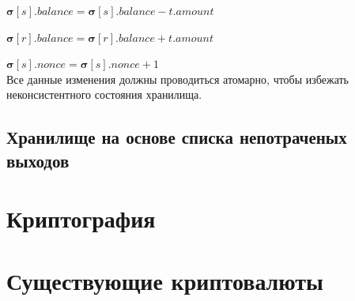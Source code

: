 $\boldsymbol{\sigma}[s].balance = \boldsymbol{\sigma}[s].balance - t.amount$

$\boldsymbol{\sigma}[r].balance = \boldsymbol{\sigma}[r].balance + t.amount$

$\boldsymbol{\sigma}[s].nonce = \boldsymbol{\sigma}[s].nonce + 1$\\
Все данные изменения должны проводиться атомарно, чтобы избежать неконсистентного состояния хранилища.

\subsection{Хранилище на основе списка непотраченых выходов}

\section{Криптография}

\section{Существующие криптовалюты}

\finishrelatedwork